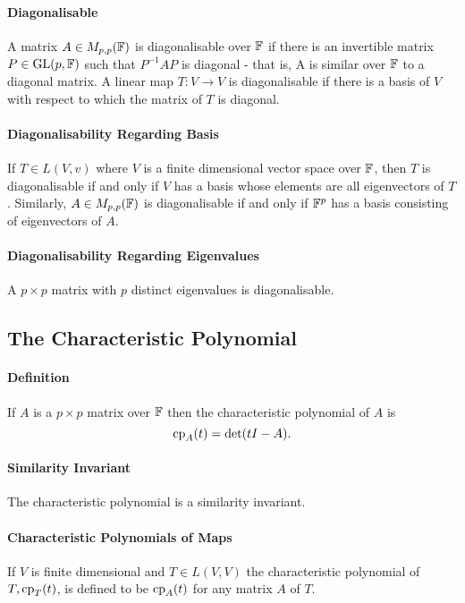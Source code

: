 \paragraph{Diagonalisable}
A matrix \(A \in M_{p,p}(\mathbb{F})\) is diagonalisable over \(\mathbb{F}\) if there is an invertible matrix \(P \in \operatorname{GL}(p,\mathbb{F})\) such that \(P^{-1}AP\) is diagonal - that is, A is similar over \(\mathbb{F}\) to a diagonal matrix. A linear map \(T: V \to V\) is diagonalisable if there is a basis of \(V\) with respect to which the matrix of \(T\) is diagonal.

\paragraph{Diagonalisability Regarding Basis}
If \(T \in L(V,v)\) where \(V\) is a finite dimensional vector space over \(\mathbb{F}\), then \(T\) is diagonalisable if and only if \(V\) has a basis whose elements are all eigenvectors of \(T\). Similarly, \(A \in M_{p,p}(\mathbb{F})\) is diagonalisable if and only if \(\mathbb{F}^p\) has a basis consisting of eigenvectors of \(A\). 

\paragraph{Diagonalisability Regarding Eigenvalues}
A \(p \times p\) matrix with \(p\) distinct eigenvalues is diagonalisable.

\subsection{The Characteristic Polynomial}
\paragraph{Definition}
If \(A\) is a \(p \times p\) matrix over \(\mathbb{F}\) then the characteristic polynomial of \(A\) is
\[\mathrm{cp}_A(t) = \det(tI - A).\]

\paragraph{Similarity Invariant}
The characteristic polynomial is a similarity invariant.

\paragraph{Characteristic Polynomials of Maps}
If \(V\) is finite dimensional and \(T \in L(V,V)\) the characteristic polynomial of \(T, \mathrm{cp}_T(t)\), is defined to be \(\mathrm{cp}_A(t)\) for any matrix \(A\) of \(T\).

